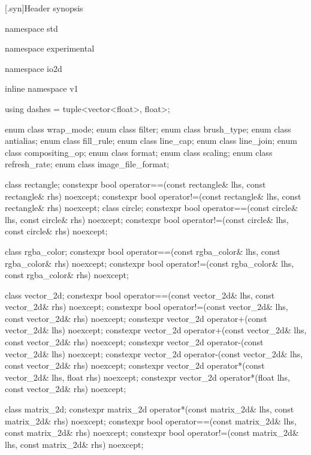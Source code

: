 [\iotwod.syn]{Header  synopsis}

%
%
\begin{codeblock}

namespace std { namespace experimental {
  namespace io2d { inline namespace v1 {

  using dashes = tuple<vector<float>, float>;

  enum class wrap_mode;
  enum class filter;
  enum class brush_type;
  enum class antialias;
  enum class fill_rule;
  enum class line_cap;
  enum class line_join;
  enum class compositing_op;
  enum class format;
  enum class scaling;
  enum class refresh_rate;
  enum class image_file_format;

  class rectangle;
  constexpr bool operator==(const rectangle& lhs, const rectangle& rhs) 
    noexcept;
  constexpr bool operator!=(const rectangle& lhs, const rectangle& rhs) 
    noexcept;
  class circle;
  constexpr bool operator==(const circle& lhs, const circle& rhs) noexcept;
  constexpr bool operator!=(const circle& lhs, const circle& rhs) noexcept;

  class rgba_color;
  constexpr bool operator==(const rgba_color& lhs, const rgba_color& rhs) 
    noexcept;
  constexpr bool operator!=(const rgba_color& lhs, const rgba_color& rhs) 
    noexcept;

  class vector_2d;
  constexpr bool operator==(const vector_2d& lhs, const vector_2d& rhs) 
    noexcept;
  constexpr bool operator!=(const vector_2d& lhs, const vector_2d& rhs) 
    noexcept;
  constexpr vector_2d operator+(const vector_2d& lhs) noexcept;
  constexpr vector_2d operator+(const vector_2d& lhs, const vector_2d& rhs) 
    noexcept;
  constexpr vector_2d operator-(const vector_2d& lhs) noexcept;
  constexpr vector_2d operator-(const vector_2d& lhs, const vector_2d& rhs) 
    noexcept;
  constexpr vector_2d operator*(const vector_2d& lhs, float rhs) noexcept;
  constexpr vector_2d operator*(float lhs, const vector_2d& rhs) noexcept;

  class matrix_2d;
  constexpr matrix_2d operator*(const matrix_2d& lhs, const matrix_2d& rhs) 
    noexcept;
  constexpr bool operator==(const matrix_2d& lhs, const matrix_2d& rhs) 
    noexcept;
  constexpr bool operator!=(const matrix_2d& lhs, const matrix_2d& rhs) 
    noexcept;

}}}}
\end{codeblock}
